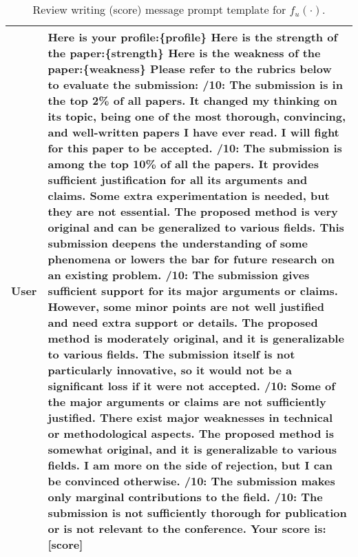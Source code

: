 \begin{table*}[ht]
\begin{tabular}{p{1cm}p{11.5cm}}
\textbf{User} & Here is your profile:\newline \{profile\} \newline Here is the strength of the paper:\newline \{strength\} \newline Here is the weakness of the paper:\newline \{weakness\} \newline Please refer to the rubrics below to evaluate the submission: \newline 10/10: The submission is in the top 2\% of all papers. It changed my thinking on its topic, being one of the most thorough, convincing, and well-written papers I have ever read. I will fight for this paper to be accepted. \newline 8/10: The submission is among the top 10\% of all the papers. It provides sufficient justification for all its arguments and claims. Some extra experimentation is needed, but they are not essential. The proposed method is very original and can be generalized to various fields. This submission deepens the understanding of some phenomena or lowers the bar for future research on an existing problem. \newline 6/10: The submission gives sufficient support for its major arguments or claims. However, some minor points are not well justified and need extra support or details. The proposed method is moderately original, and it is generalizable to various fields. The submission itself is not particularly innovative, so it would not be a significant loss if it were not accepted. \newline 5/10: Some of the major arguments or claims are not sufficiently justified. There exist major weaknesses in technical or methodological aspects. The proposed method is somewhat original, and it is generalizable to various fields. I am more on the side of rejection, but I can be convinced otherwise. \newline 3/10: The submission makes only marginal contributions to the field. \newline 1/10: The submission is not sufficiently thorough for publication or is not relevant to the conference. \newline Your score is: [score] \\ 
\bottomrule[1.5pt]
\end{tabular}
\caption{Review writing (score) message prompt template for $f_u(\cdot)$.}
\label{tab:Agent_Review_Scoring_Prompt}
\end{table*}

